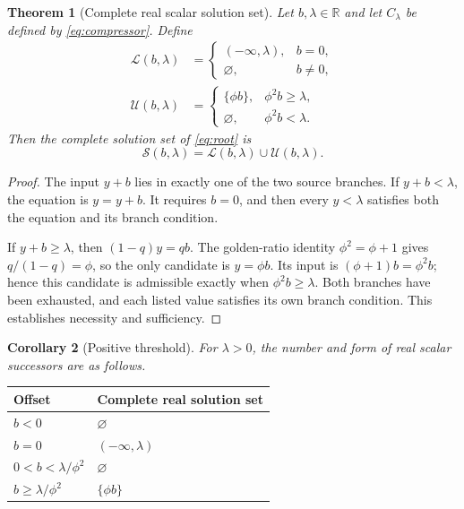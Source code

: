 \documentclass[11pt,a4paper]{article}
\newtheorem{theorem}{Theorem}[section]
\newtheorem{corollary}[theorem]{Corollary}
\theoremstyle{definition}
\newcommand{\R}{\mathbb R}
\newcommand{\phig}{\phi}
\numberwithin{equation}{section}
\begin{document}
\begin{theorem}[Complete real scalar solution set]
\label{thm:branches}
Let $b,\lambda\in\R$ and let $C_\lambda$ be defined by
\eqref{eq:compressor}. Define
\begin{align}
 \mathcal L(b,\lambda)&=
 \begin{cases}(-\infty,\lambda),&b=0,\\ \varnothing,&b\ne0,\end{cases}
 \\
 \mathcal U(b,\lambda)&=
 \begin{cases}\{\phig b\},&\phig^2b\geq\lambda,\\
 \varnothing,&\phig^2b<\lambda.\end{cases}
\end{align}
Then the complete solution set of \eqref{eq:root} is
\begin{equation}
 \mathcal S(b,\lambda)=\mathcal L(b,\lambda)\cup\mathcal U(b,\lambda).
 \label{eq:solution-set}
\end{equation}
\end{theorem}

\begin{proof}
The input $y+b$ lies in exactly one of the two source branches. If
$y+b<\lambda$, the equation is $y=y+b$. It requires $b=0$, and then every
$y<\lambda$ satisfies both the equation and its branch condition.

If $y+b\geq\lambda$, then $(1-q)y=qb$. The golden-ratio identity
$\phig^2=\phig+1$ gives $q/(1-q)=\phig$, so the only candidate is
$y=\phig b$. Its input is $(\phig+1)b=\phig^2b$; hence this candidate is
admissible exactly when $\phig^2b\geq\lambda$. Both branches have been
exhausted, and each listed value satisfies its own branch condition. This
establishes necessity and sufficiency.
\end{proof}

\begin{corollary}[Positive threshold]
\label{cor:positive}
For $\lambda>0$, the number and form of real scalar successors are as follows.
\end{corollary}

\begin{center}
\renewcommand{\arraystretch}{1.25}
\begin{tabular}{@{}ll@{}}
\toprule
Offset & Complete real solution set \\
\midrule
$b<0$ & $\varnothing$ \\
$b=0$ & $(-\infty,\lambda)$ \\
$0<b<\lambda/\phig^2$ & $\varnothing$ \\
$b\geq\lambda/\phig^2$ & $\{\phig b\}$ \\
\bottomrule
\end{tabular}
\end{center}
\end{document}
